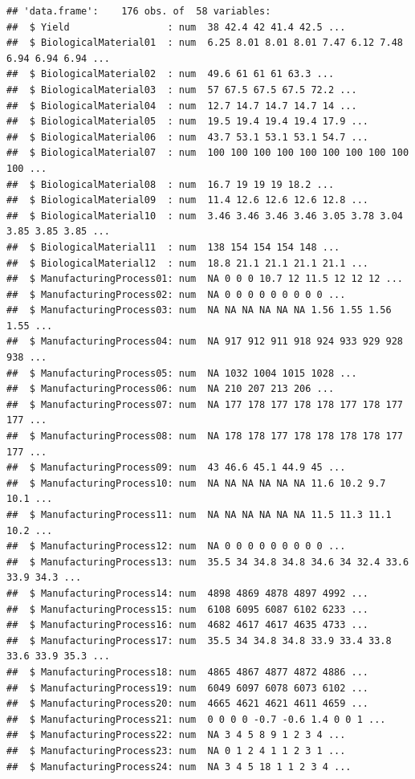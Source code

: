 \documentclass[
  11pt,
]{article}
\begin{document}
\begin{verbatim}
## 'data.frame':    176 obs. of  58 variables:
##  $ Yield                 : num  38 42.4 42 41.4 42.5 ...
##  $ BiologicalMaterial01  : num  6.25 8.01 8.01 8.01 7.47 6.12 7.48 6.94 6.94 6.94 ...
##  $ BiologicalMaterial02  : num  49.6 61 61 61 63.3 ...
##  $ BiologicalMaterial03  : num  57 67.5 67.5 67.5 72.2 ...
##  $ BiologicalMaterial04  : num  12.7 14.7 14.7 14.7 14 ...
##  $ BiologicalMaterial05  : num  19.5 19.4 19.4 19.4 17.9 ...
##  $ BiologicalMaterial06  : num  43.7 53.1 53.1 53.1 54.7 ...
##  $ BiologicalMaterial07  : num  100 100 100 100 100 100 100 100 100 100 ...
##  $ BiologicalMaterial08  : num  16.7 19 19 19 18.2 ...
##  $ BiologicalMaterial09  : num  11.4 12.6 12.6 12.6 12.8 ...
##  $ BiologicalMaterial10  : num  3.46 3.46 3.46 3.46 3.05 3.78 3.04 3.85 3.85 3.85 ...
##  $ BiologicalMaterial11  : num  138 154 154 154 148 ...
##  $ BiologicalMaterial12  : num  18.8 21.1 21.1 21.1 21.1 ...
##  $ ManufacturingProcess01: num  NA 0 0 0 10.7 12 11.5 12 12 12 ...
##  $ ManufacturingProcess02: num  NA 0 0 0 0 0 0 0 0 0 ...
##  $ ManufacturingProcess03: num  NA NA NA NA NA NA 1.56 1.55 1.56 1.55 ...
##  $ ManufacturingProcess04: num  NA 917 912 911 918 924 933 929 928 938 ...
##  $ ManufacturingProcess05: num  NA 1032 1004 1015 1028 ...
##  $ ManufacturingProcess06: num  NA 210 207 213 206 ...
##  $ ManufacturingProcess07: num  NA 177 178 177 178 178 177 178 177 177 ...
##  $ ManufacturingProcess08: num  NA 178 178 177 178 178 178 178 177 177 ...
##  $ ManufacturingProcess09: num  43 46.6 45.1 44.9 45 ...
##  $ ManufacturingProcess10: num  NA NA NA NA NA NA 11.6 10.2 9.7 10.1 ...
##  $ ManufacturingProcess11: num  NA NA NA NA NA NA 11.5 11.3 11.1 10.2 ...
##  $ ManufacturingProcess12: num  NA 0 0 0 0 0 0 0 0 0 ...
##  $ ManufacturingProcess13: num  35.5 34 34.8 34.8 34.6 34 32.4 33.6 33.9 34.3 ...
##  $ ManufacturingProcess14: num  4898 4869 4878 4897 4992 ...
##  $ ManufacturingProcess15: num  6108 6095 6087 6102 6233 ...
##  $ ManufacturingProcess16: num  4682 4617 4617 4635 4733 ...
##  $ ManufacturingProcess17: num  35.5 34 34.8 34.8 33.9 33.4 33.8 33.6 33.9 35.3 ...
##  $ ManufacturingProcess18: num  4865 4867 4877 4872 4886 ...
##  $ ManufacturingProcess19: num  6049 6097 6078 6073 6102 ...
##  $ ManufacturingProcess20: num  4665 4621 4621 4611 4659 ...
##  $ ManufacturingProcess21: num  0 0 0 0 -0.7 -0.6 1.4 0 0 1 ...
##  $ ManufacturingProcess22: num  NA 3 4 5 8 9 1 2 3 4 ...
##  $ ManufacturingProcess23: num  NA 0 1 2 4 1 1 2 3 1 ...
##  $ ManufacturingProcess24: num  NA 3 4 5 18 1 1 2 3 4 ...

\end{verbatim}
\end{document}
